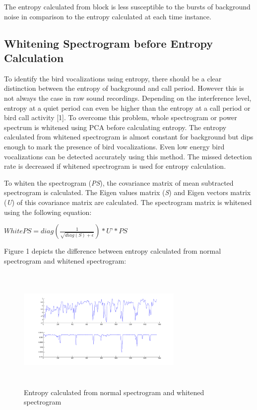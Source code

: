 \documentclass[a4paper]{article}
\begin{document}
The entropy calculated from block is less susceptible to the bursts of background noise in comparison to the entropy calculated at each time instance. 


\subsection{Whitening Spectrogram before Entropy Calculation}

To identify the bird vocalizations using entropy, there should be a clear distinction between the entropy of background and call period. However this is not always the case in raw sound recordings. Depending on the interference level, entropy at a quiet period can even be higher than the entropy at a call period or bird call activity [1]. To overcome this problem, whole spectrogram or power spectrum is whitened using PCA  before calculating entropy. The entropy calculated from whitened spectrogram is almost constant for background but dips enough to mark the presence of bird vocalizations. Even low energy bird vocalizations can be detected accurately using this method. The missed detection rate is decreased if whitened spectrogram is used for entropy calculation. 

To whiten the spectrogram (\textit{PS}), the covariance matrix of mean subtracted spectrogram is calculated. The Eigen values matrix (\textit{S}) and Eigen vectors matrix (\textit{U}) of this covariance matrix are calculated. The spectrogram matrix is whitened using the following equation:

\hspace{1cm}

$WhitePS=diag(\frac{1}{\sqrt{diag(S)+\epsilon}})*\textit{U'}*\textit{PS}$


\hspace{1cm}


Figure 1 depicts the difference between entropy calculated from normal spectrogram and whitened spectrogram:
\begin{figure}[!ht]
	\centering
	\includegraphics[width=8cm, height=6cm]{entropy}
	\caption{ Entropy calculated from normal spectrogram and whitened spectrogram}   
\end{figure}
\end{document}

